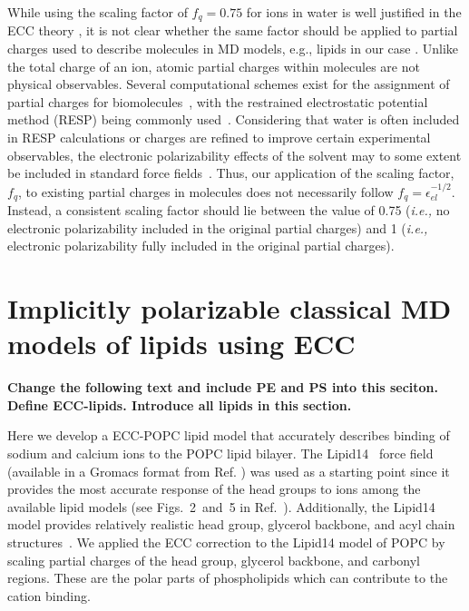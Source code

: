 While using the scaling factor of $f_q = 0.75$ for ions in water is well justified in the ECC theory \citep{leontyev11}, it is not clear whether the same factor should be applied to partial charges used to describe molecules in MD models, e.g., lipids in our case \citep{leontyev14}. Unlike the total charge of an ion, atomic partial charges within molecules are not physical observables. Several computational schemes exist for the assignment of partial charges for biomolecules~\citep{Hu2007}, with the restrained electrostatic potential method (RESP) being commonly used~\citep{RESP_paper, Singh1984}. Considering that water is often included in RESP calculations or charges are refined to improve certain experimental observables, the electronic polarizability effects of the solvent may to some extent be included in standard force fields~\citep{RESP_paper, Singh1984, jorgensen96, ipolq2013, benavides17}. Thus, our application of the scaling factor, $f_q$, to existing partial charges in molecules does not necessarily follow $f_q = \epsilon _{el} ^{-1/2}$. Instead, a consistent scaling factor should lie between the value of 0.75  (\textit{i.e.,} no electronic polarizability included in the original partial charges) and 1 (\textit{i.e.,} electronic polarizability fully included in the original partial charges).  
 



\section{Implicitly polarizable classical MD models of lipids using ECC}

\textbf{ Change the following text and include PE and PS into this seciton. 
         Define ECC-lipids. Introduce all lipids in this section. }

Here we develop a ECC-POPC lipid model that accurately describes binding  
of sodium and calcium ions to the POPC  lipid bilayer.  
The Lipid14~\citep{dickson14} force field  
(available in a Gromacs format from Ref. \citep{lipid14files}) was used as a starting  
point since  
it provides the most accurate response of the head groups to ions among the available  
lipid models (see Figs.~2~and~5 in Ref.~\citep{catte16}). Additionally, the Lipid14 model  
provides relatively realistic head group, glycerol backbone, and acyl chain structures~\citep{dickson14,botan15}. 
We applied the ECC correction  
to the Lipid14 model of POPC by scaling  
partial charges of the head group, glycerol  
backbone, and carbonyl regions.  
These are the polar parts of phospholipids which can  
contribute to the cation binding.  
 
